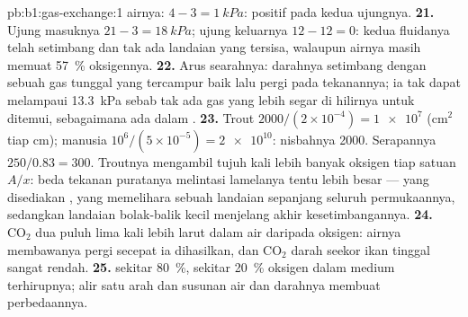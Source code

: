 \begin{solution}{pb:b1:gas-exchange:1}
airnya: $4 - 3 = \qty{1}{kPa}$: positif pada kedua ujungnya.
\textbf{21.} Ujung masuknya $21 - 3 = \qty{18}{kPa}$; ujung keluarnya $12 - 12 =
0$: kedua fluidanya telah setimbang dan tak ada landaian yang tersisa,
walaupun airnya masih memuat \qty{57}{\%} oksigennya.
\textbf{22.} Arus searahnya: darahnya setimbang dengan sebuah gas
 tunggal yang tercampur baik lalu pergi pada tekanannya; ia tak
dapat melampaui \qty{13.3}{kPa} sebab tak ada gas yang lebih segar di
hilirnya untuk ditemui, sebagaimana ada dalam .
\textbf{23.} Trout $2000/(2\times 10^{-4}) = \num{1e7}$ (cm$^2$ tiap cm);
manusia $10^6/(5\times 10^{-5}) = \num{2e10}$: nisbahnya \num{2000}.
Serapannya $250/0.83 = 300$. Troutnya mengambil tujuh kali lebih banyak
oksigen tiap satuan $A/x$: beda tekanan puratanya melintasi lamelanya
tentu lebih besar --- yang disediakan , yang memelihara
sebuah landaian sepanjang seluruh permukaannya, sedangkan landaian
 bolak-balik kecil menjelang akhir kesetimbangannya.
\textbf{24.} $\mathrm{CO_2}$ dua puluh lima kali lebih larut dalam air
daripada oksigen: airnya membawanya pergi secepat ia dihasilkan, dan
$\mathrm{CO_2}$ darah seekor ikan tinggal sangat rendah.
\textbf{25.}  sekitar \qty{80}{\%},  sekitar
\qty{20}{\%} oksigen dalam medium terhirupnya; alir satu arah 
dan susunan  air dan darahnya membuat perbedaannya.
\end{solution}
